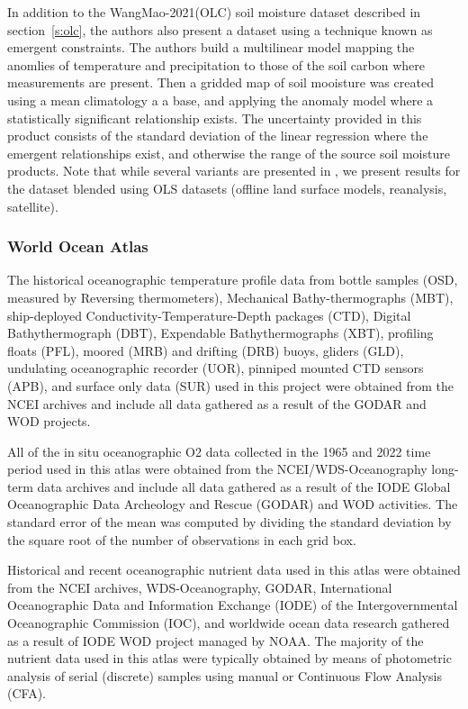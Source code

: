 \documentclass{agujournal}
\begin{document}
In addition to the WangMao-2021(OLC) soil moisture dataset described in section~\ref{s:olc}, the authors \cite{Wang_ESSD_20210907,Wang_WangMao-2021_20210101} also present a dataset using a technique known as emergent constraints. The authors build a multilinear model mapping the anomlies of temperature and precipitation to those of the soil carbon where measurements are present. Then a gridded map of soil mooisture was created using a mean climatology a a base, and applying the anomaly model where a statistically significant relationship exists. The uncertainty provided in this product consists of the standard deviation of the linear regression where the emergent relationships exist, and otherwise the range of the source soil moisture products. Note that while several variants are presented in \cite{Wang_ESSD_20210907}, we present results for the dataset blended using OLS datasets (offline land surface models, reanalysis, satellite).

\subsubsection{World Ocean Atlas}\label{s:woa}

The historical oceanographic temperature profile data from bottle samples (OSD, measured by Reversing thermometers), Mechanical Bathy-thermographs (MBT), ship-deployed Conductivity-Temperature-Depth packages (CTD), Digital Bathythermograph (DBT), Expendable Bathythermographs (XBT), profiling floats (PFL), moored (MRB) and drifting (DRB) buoys, gliders (GLD), undulating oceanographic recorder (UOR), pinniped mounted CTD sensors (APB), and surface only data (SUR) used in this project were obtained from the NCEI archives and include all data gathered as a result of the GODAR and WOD projects.

All of the in situ oceanographic O2 data collected in the 1965 and 2022 time period used in this atlas were obtained from the NCEI/WDS-Oceanography long-term data archives and include all data gathered as a result of the IODE Global Oceanographic Data Archeology and Rescue (GODAR) and WOD activities.
The standard error of the mean was computed by dividing the standard deviation by the square root of the number of observations in each grid box.

Historical and recent oceanographic nutrient data used in this atlas were obtained from the NCEI archives, WDS-Oceanography, GODAR, International Oceanographic Data and Information Exchange (IODE) of the Intergovernmental Oceanographic Commission (IOC), and worldwide ocean data research gathered as a result of IODE WOD project managed by NOAA. The majority of the nutrient data used in this atlas were typically obtained by means of photometric analysis of serial (discrete) samples using manual or Continuous Flow Analysis (CFA).
\end{document}
